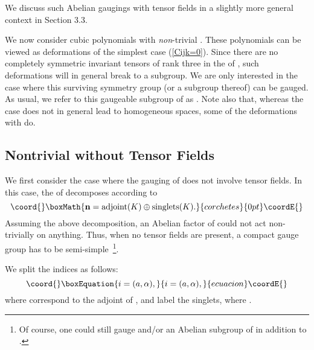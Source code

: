 \documentclass[a4paper,11pt]{article}
\providecommand{\M}{\ensuremath{\mathcal{M}}}
\begin{document}
We discuss such Abelian gaugings with tensor fields in a slightly more
general context in Section 3.3. 



We now consider cubic polynomials \coordHE{} with \emph{non}-trivial
\coordHE{}. These polynomials can be viewed as deformations of the simplest
case (\ref{Cijk=0}). Since there are no completely symmetric invariant
tensors of rank three in the \coordHE{} of \coordHE{}, such deformations
will in general break \coordHE{} to a subgroup. We are only interested in the
case where this surviving symmetry group (or a subgroup thereof) can be
gauged. As usual, we refer to this gaugeable subgroup of \coordHE{} as \coordHE{}.
Note also that, whereas the case \coordHE{} does not in general lead to
homogeneous spaces, some of the deformations with \coordHE{} do. 

\subsection{Nontrivial \coordHE{} without Tensor Fields}

We first consider the case where the gauging of \coordHE{} does not
involve tensor fields. In this case, the \coordHE{} of \coordHE{}
decomposes according to
\begin{displaymath}\coord{}\boxMath{
\mathbf{n}=\textrm{adjoint}(K)\oplus \textrm{singlets}(K).
}{corchetes}{0pt}\coordE{}\end{displaymath}
Assuming the above decomposition, an Abelian factor of \coordHE{} could
not act non-trivially on anything. Thus, when no tensor fields are
present, a compact gauge group
\coordHE{} has to be semi-simple~\footnote{Of course, one
could still gauge
\coordHE{} and/or an Abelian  subgroup of \myHighlight{$Iso(\M_Q)$}\coordHE{} in addition to
\coordHE{}.}.

We split the indices \coordHE{} as follows:
\begin{equation}\coord{}\boxEquation{
i=(a,\alpha),
}{
i=(a,\alpha),
}{ecuacion}\coordE{}\end{equation}
where \coordHE{} correspond to the
adjoint of \coordHE{}, and \coordHE{} label the \coordHE{}
singlets, where \coordHE{}.
\end{document}
